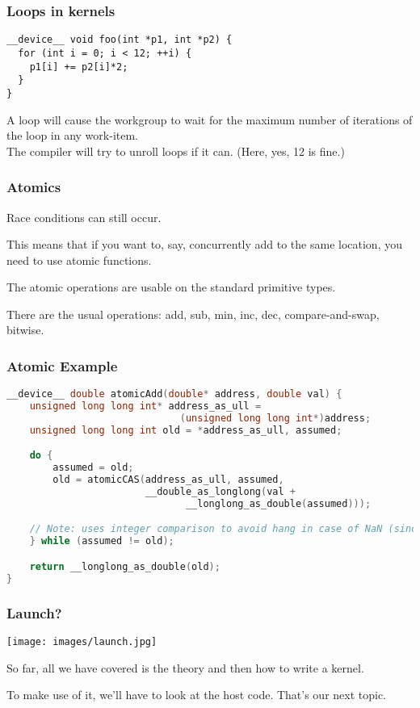 \begin{frame}[fragile]
  \frametitle{Loops in kernels}


    \begin{lstlisting}
__device__ void foo(int *p1, int *p2) {
  for (int i = 0; i < 12; ++i) {
    p1[i] += p2[i]*2;
  }
}
    \end{lstlisting}


    A loop will cause the workgroup to wait for the maximum number of
      iterations of the loop in any work-item.\\[1em]

The compiler will try to unroll loops if it can. (Here, yes, 12 is fine.)

\end{frame}


\begin{frame}
\frametitle{Atomics}

Race conditions can still occur. 

This means that if you want to, say, concurrently add to the same location, you need to use atomic functions. 

The atomic operations are usable on the standard primitive types.

There are the usual operations: add, sub, min, inc, dec, compare-and-swap, bitwise.

\end{frame}


\begin{frame}[fragile]
\frametitle{Atomic Example}

\begin{lstlisting}[language=C++]
__device__ double atomicAdd(double* address, double val) {
    unsigned long long int* address_as_ull =
                              (unsigned long long int*)address;
    unsigned long long int old = *address_as_ull, assumed;

    do {
        assumed = old;
        old = atomicCAS(address_as_ull, assumed,
                        __double_as_longlong(val +
                               __longlong_as_double(assumed)));

    // Note: uses integer comparison to avoid hang in case of NaN (since NaN != NaN)
    } while (assumed != old);

    return __longlong_as_double(old);
}
\end{lstlisting}

\end{frame}




\begin{frame}
\frametitle{Launch?}

\begin{center}
	\texttt{[image: images/launch.jpg]}
\end{center}

So far, all we have covered is the theory and then how to write a kernel. 

To make use of it, we'll have to look at the host code. That's our next topic. 

\end{frame}



